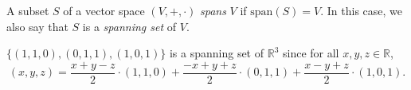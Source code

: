 \begin{definition}\label{def:spanning-set}
  A subset $S$ of a vector space $(V, +, \cdot)$ \emph{spans} $V$
  if $\mathrm{span}(S) = V$.
  In this case, we also say that $S$ is a \emph{spanning set} of $V$.
\end{definition}

\begin{example}
  $\{(1, 1, 0), (0, 1, 1), (1, 0, 1)\}$ is a spanning set of $\mathbb{R}^3$
  since for all $x, y, z \in \mathbb{R}$,
  \begin{equation*}
    (x, y, z)
      = \frac{x+y-z}{2} \cdot (1, 1, 0)
      + \frac{-x+y+z}{2} \cdot (0, 1, 1)
      + \frac{x-y+z}{2} \cdot (1, 0, 1).
  \end{equation*}
\end{example}
